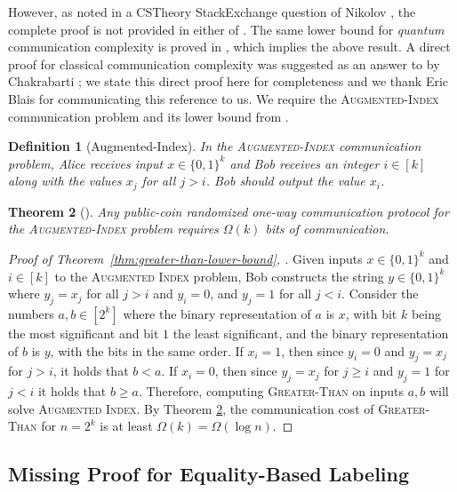 \documentclass{article}
\newtheorem{theorem}{Theorem}\newtheorem{lemma}[theorem]{Lemma}\newtheorem{proposition}[theorem]{Proposition}\newtheorem{corollary}[theorem]{Corollary}\newtheorem{definition}[theorem]{Definition}\newtheorem{claim}[theorem]{Claim}\newtheorem{remark}[theorem]{Remark}\newtheorem{observation}[theorem]{Observation}\newtheorem{conjecture}[theorem]{Conjecture}\newtheorem{example}[theorem]{Example}
\newcommand{\zo}{\{0,1\}}
\begin{document}
However, as noted in a CSTheory StackExchange question of Nikolov \cite{Nik20}, the complete proof
is not provided in either of \cite{KNR99,MNSW98}. The same lower bound for \emph{quantum}
communication complexity is proved in \cite{ATYY17}, which implies the above result.  A direct proof
for classical communication complexity was suggested as an answer to \cite{Nik20} by Chakrabarti
\cite{Chak20}; we state this direct proof here for completeness and we thank Eric Blais for
communicating this reference to us. We require the \textsc{Augmented-Index} communication problem
and its lower bound from \cite{MNSW98}.

\begin{definition}[Augmented-Index]
In the \textsc{Augmented-Index} communication problem, Alice receives input $x \in \zo^k$ and Bob
receives an integer $i \in [k]$ along with the values $x_j$ for all $j > i$. Bob should output the
value $x_i$.
\end{definition}

\begin{theorem}[\cite{MNSW98}]
\label{thm:index}
Any public-coin randomized one-way communication protocol for the \textsc{Augmented-Index} problem requires
$\Omega(k)$ bits of communication.
\end{theorem}

\begin{proof}[{Proof of Theorem~\ref{thm:greater-than-lower-bound}, \cite{Chak20}}]
Given inputs $x \in \zo^k$ and $i \in [k]$ to the \textsc{Augmented Index} problem, Bob constructs
the string $y \in \zo^k$ where $y_j = x_j$ for all $j > i$ and $y_i = 0$, and $y_j = 1$ for all $j
< i$.  Consider the numbers $a,b \in [2^k]$ where the binary representation of $a$ is $x$, with
bit $k$ being the most significant and bit $1$ the least significant, and the binary representation
of $b$ is $y$, with the bits in the same order. If $x_i = 1$, then since $y_i = 0$ and $y_j = x_j$
for $j > i$, it holds that $b < a$. If $x_i = 0$, then since $y_j = x_j$ for $j \geq i$ and $y_j =
1$ for $j < i$ it holds that $b \geq a$. Therefore, computing \textsc{Greater-Than} on inputs $a,b$
will solve \textsc{Augmented Index}. By Theorem \ref{thm:index}, the communication cost of
\textsc{Greater-Than} for $n = 2^k$ is at least $\Omega(k) = \Omega(\log n)$.
\end{proof}

\subsection{Missing Proof for Equality-Based Labeling}
\label{section:eq-labeling-proof}
\end{document}
